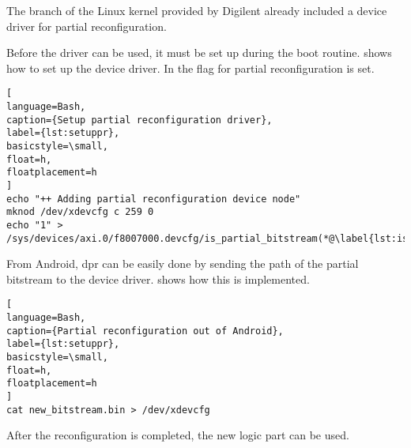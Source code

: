 The branch of the Linux kernel provided by Digilent \cite{DigilentLinux} already included a device driver for partial reconfiguration.

Before the driver can be used, it must be set up during the boot routine.  shows how to set up the device driver. In  the flag for partial reconfiguration is set.

\begin{lstlisting}[
language=Bash,
caption={Setup partial reconfiguration driver},
label={lst:setuppr},
basicstyle=\small,
float=h,
floatplacement=h
]
echo "++ Adding partial reconfiguration device node"
mknod /dev/xdevcfg c 259 0
echo "1" > /sys/devices/axi.0/f8007000.devcfg/is_partial_bitstream(*@\label{lst:ispart}@*)
\end{lstlisting}

From Android, \gls{dpr} can be easily done by sending the path of the partial bitstream to the device driver.  shows how this is implemented.

\begin{lstlisting}[
language=Bash,
caption={Partial reconfiguration out of Android},
label={lst:setuppr},
basicstyle=\small,
float=h,
floatplacement=h
]
cat new_bitstream.bin > /dev/xdevcfg
\end{lstlisting}

After the reconfiguration is completed, the new logic part can be used.
